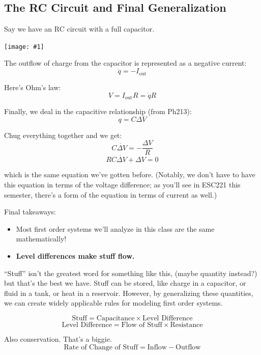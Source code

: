 \documentclass{article}
\newcommand{\bicture}[1]{
\begin{center}
    {\texttt{[image: \#1]}}
\end{center}}
\begin{document}
\begin{onehalfspacing}
\begin{flushleft}
\subsection{The RC Circuit and Final Generalization}

Say we have an RC circuit with a full capacitor. 

\bicture{2_rc}

The outflow of charge from the capacitor is represented as a negative current:
\vspace{-0.1in}
\[\dot{q} = -I_\text{out}\]

Here's Ohm's law:
\vspace{-0.1in}
\[V = I_\text{out} R = \dot{q} R\]

Finally, we deal in the capacitive relationship (from Ph213):
\vspace{-0.1in}
\[q = C\Delta V\]

Chug everything together and we get:
\vspace{-0.1in}
\[C\dot{\Delta V} = -\frac{\Delta V}{R}\]
\[\boxed{RC \dot{\Delta V} + \Delta V = 0}\]

which is the same equation we've gotten before. (Notably, we don't have to have this equation in terms of the voltage difference; as you'll see in ESC221 this semester, there's a form of the equation in terms of current as well.)

\medskip

Final takeaways:
\begin{itemize}[noitemsep,topsep=0.5pt]
    \item Most first order systems we'll analyze in this class are the same mathematically!
    \item \textbf{Level differences make stuff flow.}
\end{itemize}

\medskip

``Stuff'' isn't the greatest word for something like this, (maybe quantity instead?) but that's the best we have. Stuff can be stored, like charge in a capacitor, or fluid in a tank, or heat in a reservoir. However, by generalizing these quantities, we can create widely applicable rules for modeling first order systems.

\[\text{Stuff} = \text{Capacitance} \times \text{Level Difference}\]
\[\text{Level Difference} = \text{Flow of Stuff} \times \text{Resistance}\]

Also conservation. That's a biggie.
\[\text{Rate of Change of Stuff} = \text{Inflow} - \text{Outflow}\]


\end{flushleft}
\end{onehalfspacing}
\end{document}
